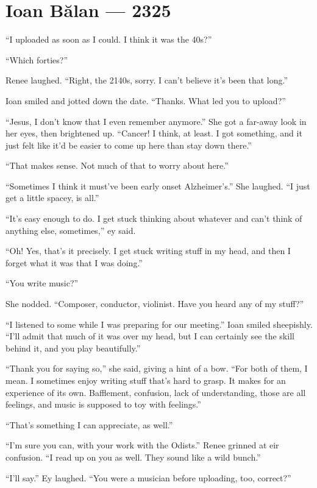 \hypertarget{ioan-bux103lan-2325}{%
\chapter{Ioan Bălan — 2325}\label{ioan-bux103lan-2325}}

``I uploaded as soon as I could. I think it was the 40s?''

``Which forties?''

Renee laughed. ``Right, the 2140s, sorry. I can't believe it's been that long.''

Ioan smiled and jotted down the date. ``Thanks. What led you to upload?''

``Jesus, I don't know that I even remember anymore.'' She got a far-away look in her eyes, then brightened up. ``Cancer! I think, at least. I got something, and it just felt like it'd be easier to come up here than stay down there.''

``That makes sense. Not much of that to worry about here.''

``Sometimes I think it must've been early onset Alzheimer's.'' She laughed. ``I just get a little spacey, is all.''

``It's easy enough to do. I get stuck thinking about whatever and can't think of anything else, sometimes,'' ey said.

``Oh! Yes, that's it precisely. I get stuck writing stuff in my head, and then I forget what it was that I was doing.''

``You write music?''

She nodded. ``Composer, conductor, violinist. Have you heard any of my stuff?''

``I listened to some while I was preparing for our meeting.'' Ioan smiled sheepishly. ``I'll admit that much of it was over my head, but I can certainly see the skill behind it, and you play beautifully.''

``Thank you for saying so,'' she said, giving a hint of a bow. ``For both of them, I mean. I sometimes enjoy writing stuff that's hard to grasp. It makes for an experience of its own. Bafflement, confusion, lack of understanding, those are all feelings, and music is supposed to toy with feelings.''

``That's something I can appreciate, as well.''

``I'm sure you can, with your work with the Odists.'' Renee grinned at eir confusion. ``I read up on you as well. They sound like a wild bunch.''

``I'll say.'' Ey laughed. ``You were a musician before uploading, too, correct?''

